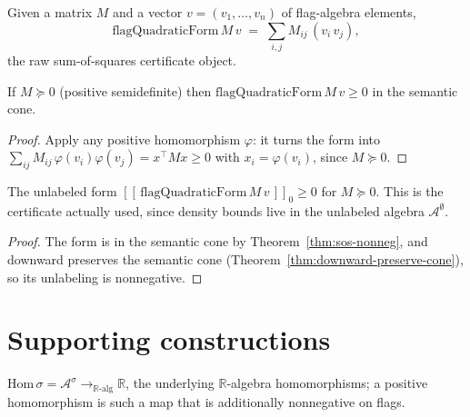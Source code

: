 \begin{definition}
  \label{def:flag-quadratic-form}
  \leanok
  Given a matrix $M$ and a vector $v = (v_1,\dots,v_n)$ of flag-algebra elements,
  \[ \mathrm{flagQuadraticForm}\,M\,v \;=\; \sum_{i,j} M_{ij}\,(v_i\, v_j), \]
  the raw sum-of-squares certificate object.
\end{definition}

\begin{theorem}
  \label{thm:sos-nonneg}
  \leanok
  If $M \succeq 0$ (positive semidefinite) then
  $\mathrm{flagQuadraticForm}\,M\,v \ge 0$ in the semantic cone.
\end{theorem}
\begin{proof}\leanok
  Apply any positive homomorphism $\varphi$: it turns the form into
  $\sum_{ij} M_{ij}\,\varphi(v_i)\varphi(v_j) = x^\top M x \ge 0$ with
  $x_i = \varphi(v_i)$, since $M \succeq 0$.
\end{proof}

\begin{theorem}
  \label{thm:sos-downward-nonneg}
  \leanok
  The unlabeled form $[\![\,\mathrm{flagQuadraticForm}\,M\,v\,]\!]_0 \ge 0$ for
  $M \succeq 0$. This is the certificate actually used, since density bounds live
  in the unlabeled algebra $\mathcal{A}^\emptyset$.
\end{theorem}
\begin{proof}\leanok
  The form is in the semantic cone by Theorem~\ref{thm:sos-nonneg}, and downward
  preserves the semantic cone (Theorem~\ref{thm:downward-preserve-cone}), so its
  unlabeling is nonnegative.
\end{proof}

\section{Supporting constructions}

\begin{definition}
  \label{def:hom}
  \leanok
  $\mathrm{Hom}\,\sigma = \mathcal{A}^\sigma \to_{\mathbb{R}\text{-alg}}
  \mathbb{R}$, the underlying $\mathbb{R}$-algebra homomorphisms; a positive
  homomorphism is such a map that is additionally nonnegative on flags.
\end{definition}

